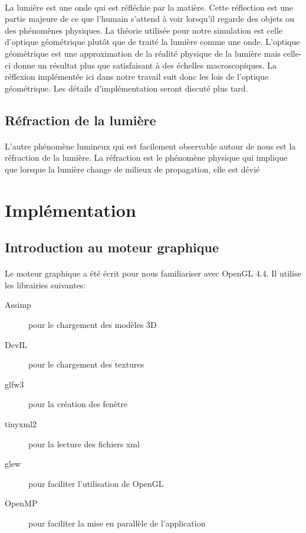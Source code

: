 \documentclass[a4paper, 12pt]{article} %
\begin{document}
        \paragraph{}
	La lumière est une onde qui est réfléchie par la matière. Cette réflection est une partie majeure de ce que l'humain s'attend à
	voir lorsqu'il regarde des objets ou des phénomènes physiques. La théorie utilisée pour notre simulation est celle d'optique
	géométrique plutôt que de traité la lumière comme une onde. L'optique géométrique est une approximation de la réalité physique 
	de la lumière mais celle-ci donne un résultat plus que satisfaisant à des échelles macroscopiques. La réflexion implémentée ici 
	dans notre travail suit donc les lois de l'optique géométrique. Les détails d'implémentation seront discuté plus tard.

    \subsection{Réfraction de la lumière}
        \paragraph{}
	L'autre phénomène lumineux qui est facilement observable autour de nous est la réfraction de la lumière. La réfraction est 
	le phénomène physique qui implique que lorsque la lumière change de milieux de propagation, elle est dévié 


\section{Implémentation}
\subsection{Introduction au moteur graphique}
	\paragraph{}
	Le moteur graphique a été écrit pour nous familiariser avec OpenGL 4.4. Il utilise les librairies suivantes:
	\begin{description}
		\item[Assimp] pour le chargement des modèles 3D
		\item[DevIL] pour le chargement des textures
		\item[glfw3] pour la création des fenêtre
		\item[tinyxml2] pour la lecture des fichiers xml
		\item[glew] pour faciliter l'utilisation de OpenGL
		\item[OpenMP] pour faciliter la mise en parallèle de l'application
	\end{description}
	
\end{document}

